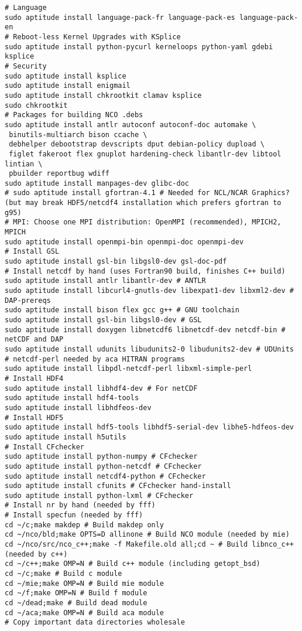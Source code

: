 \documentclass[12pt,twoside]{article}
\begin{document}
\begin{verbatim}
# Language
sudo aptitude install language-pack-fr language-pack-es language-pack-en
# Reboot-less Kernel Upgrades with KSplice
sudo aptitude install python-pycurl kerneloops python-yaml gdebi ksplice
# Security
sudo aptitude install ksplice
sudo aptitude install enigmail
sudo aptitude install chkrootkit clamav ksplice
sudo chkrootkit
# Packages for building NCO .debs
sudo aptitude install antlr autoconf autoconf-doc automake \
 binutils-multiarch bison ccache \
 debhelper debootstrap devscripts dput debian-policy dupload \
 figlet fakeroot flex gnuplot hardening-check libantlr-dev libtool lintian \
 pbuilder reportbug wdiff
sudo aptitude install manpages-dev glibc-doc
# sudo aptitude install gfortran-4.1 # Needed for NCL/NCAR Graphics? (but may break HDF5/netcdf4 installation which prefers gfortran to g95)
# MPI: Choose one MPI distribution: OpenMPI (recommended), MPICH2, MPICH
sudo aptitude install openmpi-bin openmpi-doc openmpi-dev
# Install GSL
sudo aptitude install gsl-bin libgsl0-dev gsl-doc-pdf
# Install netcdf by hand (uses Fortran90 build, finishes C++ build)
sudo aptitude install antlr libantlr-dev # ANTLR
sudo aptitude install libcurl4-gnutls-dev libexpat1-dev libxml2-dev # DAP-prereqs
sudo aptitude install bison flex gcc g++ # GNU toolchain
sudo aptitude install gsl-bin libgsl0-dev # GSL
sudo aptitude install doxygen libnetcdf6 libnetcdf-dev netcdf-bin # netCDF and DAP
sudo aptitude install udunits libudunits2-0 libudunits2-dev # UDUnits
# netcdf-perl needed by aca HITRAN programs
sudo aptitude install libpdl-netcdf-perl libxml-simple-perl
# Install HDF4
sudo aptitude install libhdf4-dev # For netCDF
sudo aptitude install hdf4-tools 
sudo aptitude install libhdfeos-dev
# Install HDF5
sudo aptitude install hdf5-tools libhdf5-serial-dev libhe5-hdfeos-dev
sudo aptitude install h5utils
# Install CFchecker
sudo aptitude install python-numpy # CFchecker
sudo aptitude install python-netcdf # CFchecker
sudo aptitude install netcdf4-python # CFchecker
sudo aptitude install cfunits # CFchecker hand-install
sudo aptitude install python-lxml # CFchecker
# Install nr by hand (needed by fff)
# Install specfun (needed by fff)
cd ~/c;make makdep # Build makdep only
cd ~/nco/bld;make OPTS=D allinone # Build NCO module (needed by mie)
cd ~/nco/src/nco_c++;make -f Makefile.old all;cd ~ # Build libnco_c++ (needed by c++)
cd ~/c++;make OMP=N # Build c++ module (including getopt_bsd)
cd ~/c;make # Build c module
cd ~/mie;make OMP=N # Build mie module
cd ~/f;make OMP=N # Build f module
cd ~/dead;make # Build dead module
cd ~/aca;make OMP=N # Build aca module
# Copy important data directories wholesale

\end{verbatim}
\end{document}
